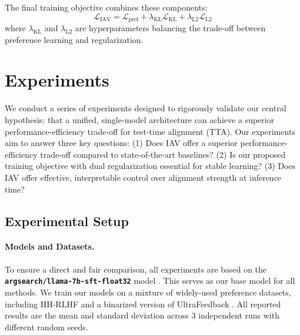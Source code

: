 \documentclass{article} %
\begin{document}
The final training objective combines these components:
\begin{equation}
\mathcal{L}_{\text{IAV}} = \mathcal{L}_{\text{pref}} + \lambda_{\text{KL}} \mathcal{L}_{\text{KL}} + \lambda_{\text{L2}} \mathcal{L}_{\text{L2}}
\end{equation}
where $\lambda_{\text{KL}}$ and $\lambda_{\text{L2}}$ are hyperparameters balancing the trade-off between preference learning and regularization.

\section{Experiments}
We conduct a series of experiments designed to rigorously validate our central hypothesis: that a unified, single-model architecture can achieve a superior performance-efficiency trade-off for test-time alignment (TTA). Our experiments aim to answer three key questions: (1) Does IAV offer a superior performance-efficiency trade-off compared to state-of-the-art baselines? (2) Is our proposed training objective with dual regularization essential for stable learning? (3) Does IAV offer effective, interpretable control over alignment strength at inference time?

\subsection{Experimental Setup}

\paragraph{Models and Datasets.}
To ensure a direct and fair comparison, all experiments are based on the \textbf{\texttt{argsearch/llama-7b-sft-float32}} model \citep{khanov2024args}. This serves as our base model for all methods. We train our models on a mixture of widely-used preference datasets, including HH-RLHF \citep{ouyang2022training} and a binarized version of UltraFeedback \citep{rafailov2023direct}. All reported results are the mean and standard deviation across 3 independent runs with different random seeds.
\end{document}
